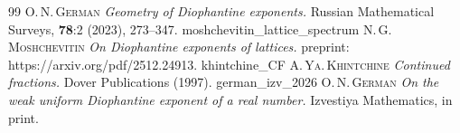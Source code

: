 \documentclass[a4paper,12pt]{article}
\theoremstyle{definition}
\theoremstyle{remark}
\theoremstyle{plain}
\begin{document}
\begin{thebibliography}{99}
    \textsc{O.\,N.\,German} 
    \textit{Geometry of Diophantine exponents.}
    Russian Mathematical Surveys, \textbf{78}:2 (2023), 273--347.
\bibitem
    {moshchevitin_lattice_spectrum}
    \textsc{N.\,G.\,Moshchevitin}
    \textit{On Diophantine exponents of lattices.}
    preprint: https://arxiv.org/pdf/2512.24913.
\bibitem
    {khintchine_CF}
    \textsc{A.\,Ya.\,Khintchine}
    \textit{Continued fractions.}
    Dover Publications (1997).
\bibitem
    {german_izv_2026}
    \textsc{O.\,N.\,German} 
    \textit{On the weak uniform Diophantine exponent of a real number.}
    Izvestiya Mathematics, in print. %

\end{thebibliography}
\end{document}
